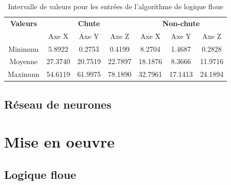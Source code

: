 \documentclass[12pt,letterpaper]{article}
\begin{document}
\begin{table}[h]
  \begin{center}
    \begin{tabular} {|c|c|c|c|c|c|c|}
        \hline
        \textbf{Valeurs} & \multicolumn{3}{|c|}{\textbf{Chute}} & \multicolumn{3}{|c|}{\textbf{Non-chute}} \\ \cline{2-7}
         & Axe X & Axe Y & Axe Z & Axe X & Axe Y & Axe Z \\
        \hline
        Minimum & 5.8922  & 0.2753  & 0.4199  & 8.2704  & 1.4687  & 0.2828 \\
        \hline
        Moyenne & 27.3740 & 20.7519 & 22.7897 & 18.1876 & 8.3666  & 11.9716 \\
        \hline
        Maximum & 54.6119 & 61.9975 & 78.1890 & 32.7961 & 17.1413 & 24.1894 \\
        \hline
    \end{tabular}
    \caption{Intervalle de valeurs pour les entrées de l'algorithme de logique floue}
    \label{tbl:f_input_val}
  \end{center}
\end{table}

\subsection{Réseau de neurones} %

\section{Mise en oeuvre}

\subsection{Logique floue}
\end{document}
